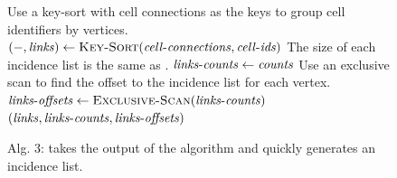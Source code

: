 \documentclass[review,journal]{vgtc}         %
\begin{document}
\noindent
\begin{figure}[b]
\vspace{-0.4cm}
\begin{codebox}
  \zi \Comment Use a key-sort with cell connections as the keys to
  \zi \Comment group cell identifiers by vertices.
  \li $(-, \id{links}) \gets \proc{Key-Sort}(\id{cell-connections},\id{cell-ids})$
  \zi \Comment The size of each incidence list is the same as .
  \li $\id{links-counts} \gets \id{counts}$
  \zi \Comment Use an exclusive scan to find the offset to the incidence
  \zi \Comment list for each vertex.
  \li $\id{links-offsets} \gets \proc{Exclusive-Scan}(\id{links-counts})$
  \li \Return $(\id{links},\id{links-counts},\id{links-offsets})$
\end{codebox}
\vspace{-0.4cm}
\caption*{Alg. 3:  takes the output of the  algorithm and quickly generates an incidence list.}
\end{figure}

\end{document}
